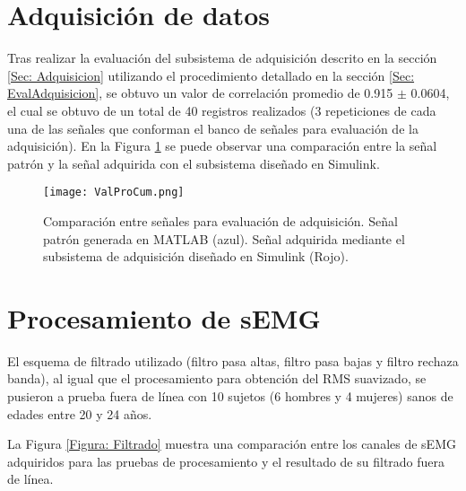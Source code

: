 
\section{Adquisición de datos}
Tras realizar la evaluación del subsistema de adquisición descrito en la sección \ref{Sec: Adquisicion} utilizando el procedimiento detallado en la sección \ref{Sec: EvalAdquisicion}, se obtuvo un valor de correlación promedio de 0.915 $\pm$ 0.0604, el cual se obtuvo de un total de 40 registros realizados (3 repeticiones de cada una de las señales que conforman el banco de señales para evaluación de la adquisición). En la Figura \ref{Figura: ValProCum} se puede observar una comparación entre la señal patrón y la señal adquirida con el subsistema diseñado en Simulink\textregistered.



\begin{figure}[htbp]
	\centering
	\texttt{[image: ValProCum.png]}
	\caption[Comparación entre señales para evaluación de adquisición.]{Comparación entre señales para evaluación de adquisición. Señal patrón generada en MATLAB\textregistered \; (azul). Señal adquirida mediante el subsistema de adquisición diseñado en Simulink\textregistered \; (Rojo).}
	\label{Figura: ValProCum}
\end{figure}


\section{Procesamiento de sEMG}
El esquema de filtrado utilizado (filtro pasa altas, filtro pasa bajas y filtro rechaza banda), al igual que el procesamiento para obtención del RMS suavizado, se pusieron a prueba fuera de línea con 10 sujetos (6 hombres y 4 mujeres) sanos de edades entre 20 y 24 años.

La Figura \ref{Figura: Filtrado} muestra una comparación entre los canales de sEMG adquiridos para las pruebas de procesamiento y el resultado de su filtrado fuera de línea.

